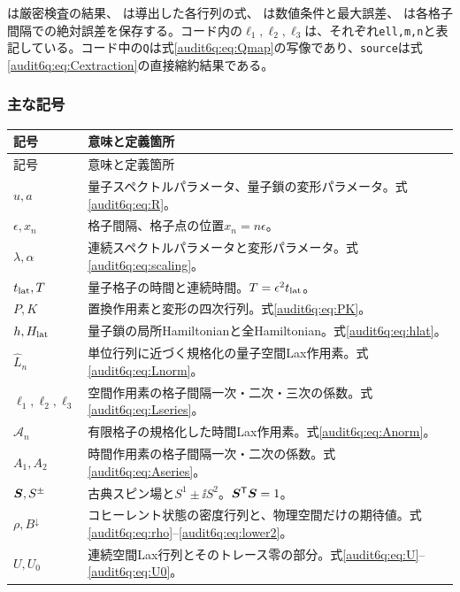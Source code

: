 は厳密検査の結果、
は導出した各行列の式、
は数値条件と最大誤差、
は各格子間隔での絶対誤差を保存する。コード内の$\ell_1,\ell_2,\ell_3$は、それぞれ\texttt{ell,m,n}と表記している。コード中の\texttt{Q}は式\eqref{audit6q:eq:Qmap}の写像であり、\texttt{source}は式\eqref{audit6q:eq:Cextraction}の直接縮約結果である。

\subsubsection{主な記号}
\small
\begin{longtable}{L{26mm}L{103mm}}
\toprule
記号&意味と定義箇所\\\midrule\endfirsthead
\toprule 記号&意味と定義箇所\\\midrule\endhead
\bottomrule\endfoot
$u,a$&量子スペクトルパラメータ、量子鎖の変形パラメータ。式\eqref{audit6q:eq:R}。\\
$\epsilon,x_n$&格子間隔、格子点の位置$x_n=n\epsilon$。\\
$\lambda,\alpha$&連続スペクトルパラメータと変形パラメータ。式\eqref{audit6q:eq:scaling}。\\
$t_{\rm lat},T$&量子格子の時間と連続時間。$T=\epsilon^2t_{\rm lat}$。\\
$P,K$&置換作用素と変形の四次行列。式\eqref{audit6q:eq:PK}。\\
$h,H_{\rm lat}$&量子鎖の局所Hamiltonianと全Hamiltonian。式\eqref{audit6q:eq:hlat}。\\
$\widehat L_n$&単位行列に近づく規格化の量子空間Lax作用素。式\eqref{audit6q:eq:Lnorm}。\\
$\ell_1,\ell_2,\ell_3$&空間作用素の格子間隔一次・二次・三次の係数。式\eqref{audit6q:eq:Lseries}。\\
$\widehat{\mathcal A}_n$&有限格子の規格化した時間Lax作用素。式\eqref{audit6q:eq:Anorm}。\\
$A_1,A_2$&時間作用素の格子間隔一次・二次の係数。式\eqref{audit6q:eq:Aseries}。\\
$\boldsymbol S,S^\pm$&古典スピン場と$S^1\pm\ii S^2$。$\boldsymbol S^{\mathsf T}\boldsymbol S=1$。\\
$\rho,B^\downarrow$&コヒーレント状態の密度行列と、物理空間だけの期待値。式\eqref{audit6q:eq:rho}--\eqref{audit6q:eq:lower2}。\\
$U,U_0$&連続空間Lax行列とそのトレース零の部分。式\eqref{audit6q:eq:U}--\eqref{audit6q:eq:U0}。\\

\end{longtable}
